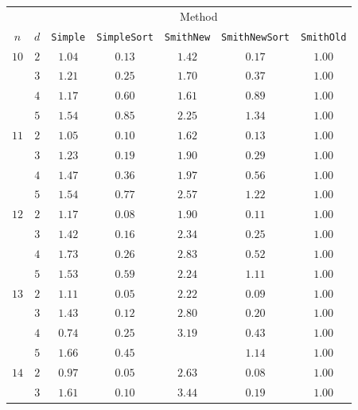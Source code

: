 \begin{table}[htbp]
  \centering
  \begin{tabular}{ccccccc}
    \toprule
         &     & \multicolumn{5}{c}{Method}                               \\
    \cmidrule(l){3-7}
    $n$  & $d$ & \texttt{Simple} & \texttt{SimpleSort} & \texttt{SmithNew} & \texttt{SmithNewSort} & \texttt{SmithOld} \\
    \cmidrule(r){1-2}\cmidrule(l){3-7}
    $10$ & $2$ & $1.04$ & $0.13$     & $1.42$   & $0.17$       & $1.00$   \\
         & $3$ & $1.21$ & $0.25$     & $1.70$   & $0.37$       & $1.00$   \\
         & $4$ & $1.17$ & $0.60$     & $1.61$   & $0.89$       & $1.00$   \\
         & $5$ & $1.54$ & $0.85$     & $2.25$   & $1.34$       & $1.00$   \\
    \cmidrule(r){1-2}
    $11$ & $2$ & $1.05$ & $0.10$     & $1.62$   & $0.13$       & $1.00$   \\
         & $3$ & $1.23$ & $0.19$     & $1.90$   & $0.29$       & $1.00$   \\
         & $4$ & $1.47$ & $0.36$     & $1.97$   & $0.56$       & $1.00$   \\
         & $5$ & $1.54$ & $0.77$     & $2.57$   & $1.22$       & $1.00$   \\
    \cmidrule(r){1-2}
    $12$ & $2$ & $1.17$ & $0.08$     & $1.90$   & $0.11$       & $1.00$   \\
         & $3$ & $1.42$ & $0.16$     & $2.34$   & $0.25$       & $1.00$   \\
         & $4$ & $1.73$ & $0.26$     & $2.83$   & $0.52$       & $1.00$   \\
         & $5$ & $1.53$ & $0.59$     & $2.24$   & $1.11$       & $1.00$   \\
    \cmidrule(r){1-2}
    $13$ & $2$ & $1.11$ & $0.05$     & $2.22$   & $0.09$       & $1.00$   \\
         & $3$ & $1.43$ & $0.12$     & $2.80$   & $0.20$       & $1.00$   \\
         & $4$ & $0.74$ & $0.25$     & $3.19$   & $0.43$       & $1.00$   \\
         & $5$ & $1.66$ & $0.45$     &          & $1.14$       & $1.00$   \\
    \cmidrule(r){1-2}
    $14$ & $2$ & $0.97$ & $0.05$     & $2.63$   & $0.08$       & $1.00$   \\
         & $3$ & $1.61$ & $0.10$     & $3.44$   & $0.19$       & $1.00$   \\

\end{tabular}
\end{table}

